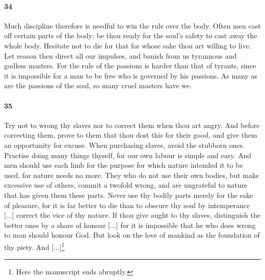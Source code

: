 \documentclass[12pt]{article}
\begin{document}
\paragraph{34} Much discipline therefore is needful to win the rule over the
body. Often men cast off certain parts of the body; be thou ready for the
soul's safety to cast away the whole body. Hesitate not to die for that for
whose sake thou art willing to live. Let reason then direct all our impulses,
and banish from us tyrannous and godless masters. For the rule of the passions
is harder than that of tyrants, since it is impossible for a man to be free who
is governed by his passions. As many as are the passions of the soul, so many
cruel masters have we. 

\paragraph{35} Try not to wrong thy slaves nor to correct them when thou art
angry. And before correcting them, prove to them that thou dost this for their
good, and give them an opportunity for excuse. When purchasing slaves, avoid
the stubborn ones. Practise doing many things thyself, for our own labour is
simple and easy. And men should use each limb for the purpose for which nature
intended it to be used, for nature needs no more. They who do not use their own
bodies, but make excessive use of others, commit a twofold wrong, and are
ungrateful to nature that has given them these parts. Never use thy bodily
parts merely for the sake of pleasure, for it is far better to die than to
obscure thy soul by intemperance [...] correct the vice of thy nature. If thou
give aught to thy slaves, distinguish the better ones by a share of honour
[...] for it is impossible that he who does wrong to man should honour God. But
look on the love of mankind as the foundation of thy piety. And
[...]\footnote{Here the manuscript ends abruptly.}
\end{document}
